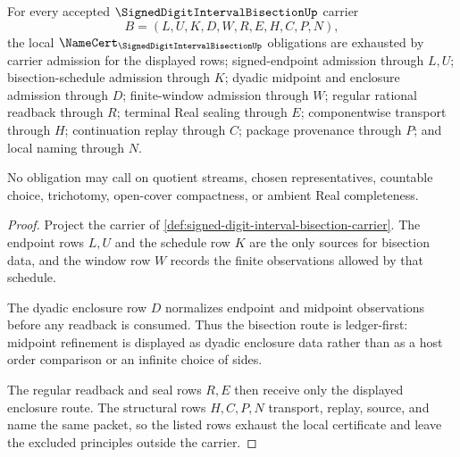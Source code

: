 \begin{theorem}
\label{thm:signed-digit-interval-bisection-namecert-obligations}
For every accepted $\SignedDigitIntervalBisectionUp$ carrier
$$
B=(L,U,K,D,W,R,E,H,C,P,N),
$$
the local $\NameCert_{\SignedDigitIntervalBisectionUp}$ obligations are exhausted by carrier admission for the displayed rows; signed-endpoint admission through $L,U$; bisection-schedule admission through $K$; dyadic midpoint and enclosure admission through $D$; finite-window admission through $W$; regular rational readback through $R$; terminal Real sealing through $E$; componentwise transport through $H$; continuation replay through $C$; package provenance through $P$; and local naming through $N$.

No obligation may call on quotient streams, chosen representatives, countable choice, trichotomy, open-cover compactness, or ambient Real completeness.
\end{theorem}
\begin{proof}
Project the carrier of \autoref{def:signed-digit-interval-bisection-carrier}. The endpoint rows $L,U$ and the schedule row $K$ are the only sources for bisection data, and the window row $W$ records the finite observations allowed by that schedule.

The dyadic enclosure row $D$ normalizes endpoint and midpoint observations before any readback is consumed. Thus the bisection route is ledger-first: midpoint refinement is displayed as dyadic enclosure data rather than as a host order comparison or an infinite choice of sides.

The regular readback and seal rows $R,E$ then receive only the displayed enclosure route. The structural rows $H,C,P,N$ transport, replay, source, and name the same packet, so the listed rows exhaust the local certificate and leave the excluded principles outside the carrier.
\end{proof}

